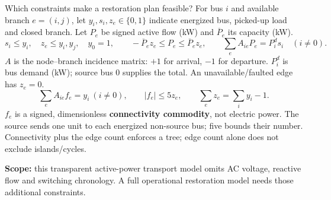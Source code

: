 \begin{frame}[t]{Which constraints make a restoration plan feasible?}
\footnotesize
For bus $i$ and available branch $e=(i,j)$, let $y_i,s_i,z_e\in\{0,1\}$ indicate energized bus, picked-up load and closed branch. Let $P_e$ be signed active flow (kW) and $\overline P_e$ its capacity (kW).
\[
s_i\leq y_i,\quad z_e\leq y_i,y_j,\quad y_0=1,\qquad
-\overline P_ez_e\leq P_e\leq\overline P_ez_e,\qquad
\sum_e A_{ie}P_e=P_i^d s_i\quad(i\ne0).
\]
$A$ is the node--branch incidence matrix: $+1$ for arrival, $-1$ for departure. $P_i^d$ is bus demand (kW); source bus 0 supplies the total. An unavailable/faulted edge has $z_e=0$.
\[
\sum_e A_{ie}f_e=y_i\ (i\ne0),\qquad |f_e|\leq5z_e,\qquad
\sum_e z_e=\sum_i y_i-1.
\]
$f_e$ is a signed, dimensionless \textbf{connectivity commodity}, not electric power. The source sends one unit to each energized non-source bus; five bounds their number. Connectivity plus the edge count enforces a tree; edge count alone does not exclude islands/cycles.
\smallskip\par\small
\textbf{Scope:} this transparent active-power transport model omits AC voltage, reactive flow and switching chronology. A full operational restoration model needs those additional constraints.
\end{frame}

